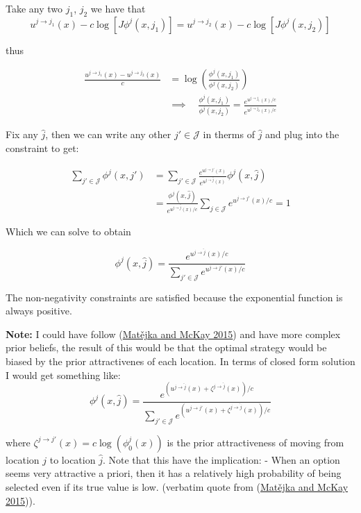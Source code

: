 \documentclass[
  letterpaper,
  DIV=11,
  numbers=noendperiod]{scrreprt}
\begin{document}
Take any two \(j_1\), \(j_2\) we have that
\[u^{j\to j_1}(x)  - c \log[J \phi^j(x, j_1)] =u^{j\to j_2}(x)  - c \log[J \phi^j(x, j_2)]\]

thus

\begin{align*}
  \frac{u^{j\to j_1}(x) - u^{j\to j_2}(x) }{c} &= \log\left(\frac{ \phi^j(x, j_1)}{ \phi^j(x, j_2)}\right) \\ 
  &\implies \quad \frac{ \phi^j(x, j_1)}{ \phi^j(x, j_2)} = \frac{
    e^{
       u^{j\to j_1}(x) / c 
        }
        }{e^{
u^{j\to j_2}(x) / c
        }
        }
\end{align*}

Fix any \(\hat{j}\), then we can write any other \(j'\in\mathcal{J}\) in
therms of \(\hat{j}\) and plug into the constraint to get:

\begin{align*}
  \sum_{j'\in \mathcal{J}}\phi^j(x, j') &= \sum_{j'\in \mathcal{J}}\frac{e^{u^{j\to j'}(x) }}{e^{u^{j\to \hat{j}}(x) }} \phi^j(x, \hat{j})\\  &= \frac{\phi^j(x, \hat{j})}{e^{u^{j\to \hat{j}}(x) / c}} \sum_{j\in \mathcal{J}}e^{u^{j\to j'}(x) / c} = 1
\end{align*}

Which we can solve to obtain

\begin{equation}
\label{eq:optimal-search-strategy}
    \phi^j(x,\hat{j}) = \frac{e^{u^{j\to \hat{j}}(x) / c}}{\sum_{ j' \in \mathcal{J}}e^{u^{j\to j'}(x) / c}}
\end{equation}

The non-negativity constraints are satisfied because the exponential
function is always positive.

\textbf{Note:} I could have follow
(\protect\hyperlink{ref-matejkaRationalInattentionDiscrete2015}{Matějka
and McKay 2015}) and have more complex prior beliefs, the result of this
would be that the optimal strategy would be biased by the prior
attractivenes of each location. In terms of closed form solution I would
get something like:
\[\phi^j(x,\hat{j}) = \frac{e^{(u^{j\to \hat{j}}(x) + \zeta^{j \to \hat{j}}(x) )/ c}}{\sum_{ j' \in \mathcal{J}}e^{(u^{j\to j'}(x) + \zeta^{j \to \hat{j}}(x)) / c}}\]

where \(\zeta^{j \to j'}(x) = c \log(\phi^j_0(x))\) is the prior
attractiveness of moving from location \(j\) to location \(\hat{j}\).
Note that this have the implication: - When an option seems very
attractive a priori, then it has a relatively high probability of being
selected even if its true value is low. (verbatim quote from
(\protect\hyperlink{ref-matejkaRationalInattentionDiscrete2015}{Matějka
and McKay 2015})).
\end{document}
